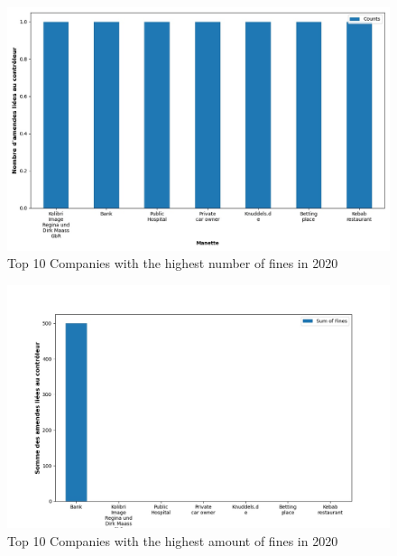 \documentclass[12pt]{article}
\begin{document}
\newpage

	
	\begin{multicols}{2}
	\begin{figure}
		[H]\centering\includegraphics[width=1.0\linewidth]{graphs/top10_controller_year}
		\caption{Top 10 Companies with the highest number of fines in 2020}
	\end{figure}
	\begin{figure}
		[H]\centering\includegraphics[width=1\linewidth]{graphs/top10_controller_year_fines}
		\caption{Top 10 Companies with the highest  amount of fines in 2020}
	 \end{figure}
	
	\end{multicols}
\end{document}
